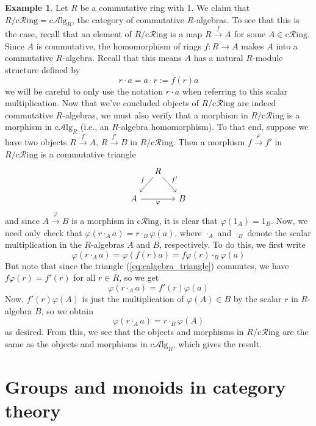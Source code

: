 \documentclass[10pt,oneside]{book}
\def\~#1{\mathscr{#1}}
\def\To#1{\xrightarrow{#1}}
\newcommand{\cAlg}{\mathrm{c}\~{A}\mathrm{lg}}
\newcommand{\cRing}{\mathrm{c}\~{R}\mathrm{ing}}
\newcommand{\vp}{\varphi}
\theoremstyle{plain}
\theoremstyle{definition}
\newtheorem{ex}[thm]{Example}
\theoremstyle{remark}
\numberwithin{equation}{section}
\numberwithin{figure}{section}
\begin{document}
\begin{ex}
    Let $R$ be a commutative ring with 1. We claim that $R/\cRing = \cAlg_R$, the category of commutative $R$-algebras. To see that this is the case, recall that an element of $R/\cRing$ is a map $R \To{f} A$ for some $A \in \cRing$. Since $A$ is commutative, the homomorphism of rings $f: R \to A$ makes $A$ into a commutative $R$-algebra. Recall that this means $A$ has a natural $R$-module structure defined by 
    \[r \cdot a = a \cdot r := f(r)a\]
    we will be careful to only use the notation $r \cdot a$ when referring to this scalar multiplication. Now that we've concluded objects of $R/\cRing$ are indeed commutative $R$-algebras, we must also verify that a morphism in $R/\cRing$ is a morphism in $\cAlg_R$ (i.e., an $R$-algebra homomorphism). To that end, suppose we have two objects $R \To{f} A$, $R \To{f'} B$ in $R/\cRing$. Then a morphism $f \To{\vp} f'$ in $R/\cRing$ is a commutative triangle
        \begin{equation}
            \label{eq:calgebra_triangle}
            \begin{tikzcd}[column sep=small]
                & R \arrow[dl, "f", swap] \arrow[dr, "f'"] & \\
                A \arrow[rr, "\vp", swap] & & B
            \end{tikzcd}
        \end{equation}
    and since $A \To{\vp} B$ is a morphism in $\cRing$, it is clear that $\vp(1_A) = 1_B$. 
    Now, we need only check that $\vp(r \cdot_A a) = r \cdot_B \vp(a)$, where $\cdot_A$ and $\cdot_B$ denote the scalar multiplication in the $R$-algebras $A$ and $B$, respectively. To do this, we first write
        \[\vp(r \cdot_A a) = \vp(f(r)a) = f \vp(r) \cdot_B \vp(a)\]
    But note that since the triangle (\ref{eq:calgebra_triangle}) commutes, we have $f\vp(r) = f'(r)$ for all $r \in R$, so we get
        \[\vp(r \cdot_A a) = f'(r)\vp(a)\]
    Now, $f'(r)\vp(A)$ is just the multiplication of $\vp(A) \in B$ by the scalar $r$ in $R$-algebra $B$, so we obtain
        \[\vp(r \cdot_A a) = r \cdot_B \vp(A)\]
    as desired. From this, we see that the objects and morphisms in $R/\cRing$ are the same as the objects and morphisms in $\cAlg_R$, which gives the result.
\end{ex}

\section{Groups and monoids in category theory}
\end{document}
